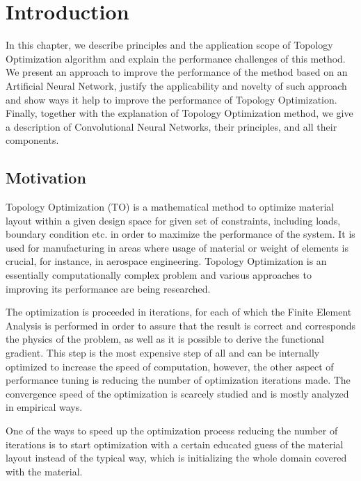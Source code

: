 
\chapter{Introduction}
\label{chapter:Introduction}

In this chapter, we describe principles and the application scope of Topology Optimization algorithm and explain the performance challenges of this method.
We present an approach to improve the performance of the method based on an Artificial Neural Network, justify the applicability and novelty of such approach and show ways it help to improve the performance of Topology Optimization. 
Finally, together with the explanation of Topology Optimization method, we give a description of Convolutional Neural Networks, their principles, and all their components.


\section{Motivation}

Topology Optimization (TO) is a mathematical method to optimize material layout within a given design space for given set of constraints, including loads, boundary condition etc. in order to maximize the performance of the system.
It is used for manufacturing in areas where usage of material or weight of elements is crucial, for instance, in aerospace engineering\cite{}.
Topology Optimization is an essentially computationally complex problem and various approaches to improving its performance are being researched.
\medskip

The optimization is proceeded in iterations, for each of which the Finite Element Analysis is performed in order to assure that the result is correct and corresponds the physics of the problem, as well as it is possible to derive the functional gradient.
This step is the most expensive step of all and can be internally optimized to increase the speed of computation, however, the other aspect of performance tuning is reducing the number of optimization iterations made.
The convergence speed of the optimization is scarcely studied and is mostly analyzed in empirical ways.
\medskip

One of the ways to speed up the optimization process reducing the number of iterations is to start optimization with a certain educated guess of the material layout instead of the typical way, which is initializing the whole domain covered with the material.

